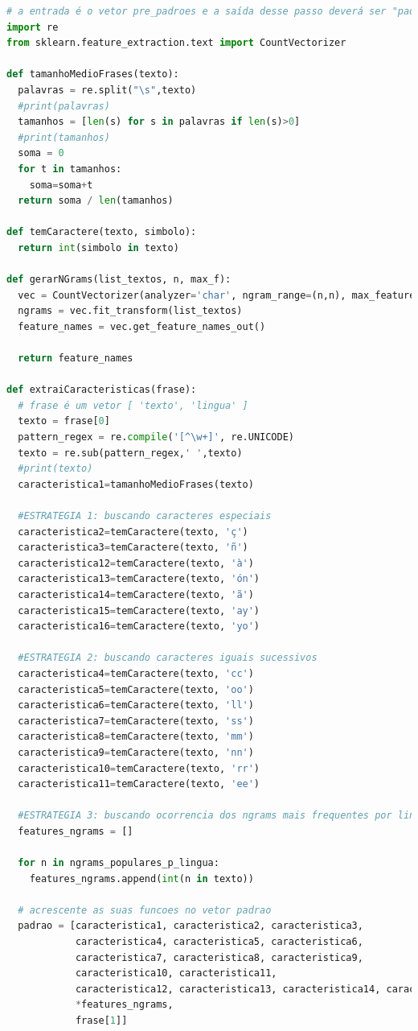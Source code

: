 \begin{lstlisting}[language=Python, style=input]
# a entrada é o vetor pre_padroes e a saída desse passo deverá ser "padrões"
import re
from sklearn.feature_extraction.text import CountVectorizer

def tamanhoMedioFrases(texto):
  palavras = re.split("\s",texto)
  #print(palavras)
  tamanhos = [len(s) for s in palavras if len(s)>0]
  #print(tamanhos)
  soma = 0
  for t in tamanhos:
    soma=soma+t
  return soma / len(tamanhos)

def temCaractere(texto, simbolo):
  return int(simbolo in texto)

def gerarNGrams(list_textos, n, max_f):
  vec = CountVectorizer(analyzer='char', ngram_range=(n,n), max_features=max_f)
  ngrams = vec.fit_transform(list_textos)
  feature_names = vec.get_feature_names_out()

  return feature_names

def extraiCaracteristicas(frase):
  # frase é um vetor [ 'texto', 'lingua' ]
  texto = frase[0]
  pattern_regex = re.compile('[^\w+]', re.UNICODE)
  texto = re.sub(pattern_regex,' ',texto)
  #print(texto)
  caracteristica1=tamanhoMedioFrases(texto)

  #ESTRATEGIA 1: buscando caracteres especiais
  caracteristica2=temCaractere(texto, 'ç')
  caracteristica3=temCaractere(texto, 'ñ')
  caracteristica12=temCaractere(texto, 'à')
  caracteristica13=temCaractere(texto, 'ón')
  caracteristica14=temCaractere(texto, 'ã')
  caracteristica15=temCaractere(texto, 'ay')
  caracteristica16=temCaractere(texto, 'yo')

  #ESTRATEGIA 2: buscando caracteres iguais sucessivos
  caracteristica4=temCaractere(texto, 'cc')
  caracteristica5=temCaractere(texto, 'oo')
  caracteristica6=temCaractere(texto, 'll')
  caracteristica7=temCaractere(texto, 'ss')
  caracteristica8=temCaractere(texto, 'mm')
  caracteristica9=temCaractere(texto, 'nn')
  caracteristica10=temCaractere(texto, 'rr')
  caracteristica11=temCaractere(texto, 'ee')

  #ESTRATEGIA 3: buscando ocorrencia dos ngrams mais frequentes por lingua
  features_ngrams = []

  for n in ngrams_populares_p_lingua:
    features_ngrams.append(int(n in texto))

  # acrescente as suas funcoes no vetor padrao
  padrao = [caracteristica1, caracteristica2, caracteristica3,
            caracteristica4, caracteristica5, caracteristica6,
            caracteristica7, caracteristica8, caracteristica9,
            caracteristica10, caracteristica11,
            caracteristica12, caracteristica13, caracteristica14, caracteristica15, caracteristica16,
            *features_ngrams,
            frase[1]]


\end{lstlisting}
